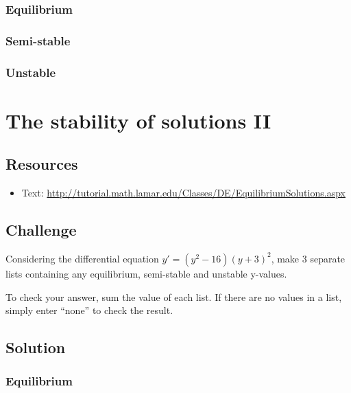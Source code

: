 \subsubsection*{Equilibrium}
\six{}


\subsubsection*{Semi-stable}
\six{}


\subsubsection*{Unstable}
\six{}


\timebox



\newpage
\section{The stability of solutions II}

\subsection*{Resources}
\begin{itemize}
    \item Text: \url{http://tutorial.math.lamar.edu/Classes/DE/EquilibriumSolutions.aspx}
\end{itemize}

\subsection*{Challenge}
Considering the differential equation $y'=(y^2-16)(y+3)^2$, make 3 separate lists containing any equilibrium, semi-stable and unstable y-values.

To check your answer, sum the value of each list. If there are no values in a list, simply enter ``none'' to check the result.

\subsection*{Solution}
\subsubsection*{Equilibrium}
\six{}

